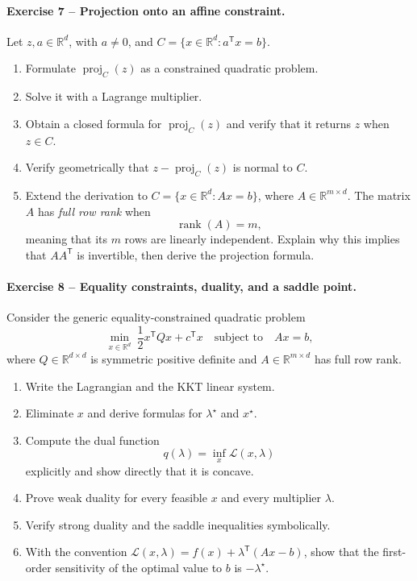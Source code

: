 \documentclass[10pt]{article}
\newcommand{\R}{\mathbb{R}}
\newcommand{\trans}{^{\mathsf T}}
\newcommand{\proj}{\operatorname{proj}}
\begin{document}
\paragraph{Exercise 7 -- Projection onto an affine constraint.}
Let $z,a\in\R^d$, with $a\neq0$, and
$C=\{x\in\R^d:a\trans x=b\}$.
\begin{enumerate}
\item Formulate $\proj_C(z)$ as a constrained quadratic problem.
\item Solve it with a Lagrange multiplier.
\item Obtain a closed formula for $\proj_C(z)$ and verify that it returns $z$
when $z\in C$.
\item Verify geometrically that $z-\proj_C(z)$ is normal to $C$.
\item Extend the derivation to $C=\{x\in\R^d:Ax=b\}$, where
$A\in\R^{m\times d}$. The matrix $A$ has \emph{full row rank} when
\[
  \operatorname{rank}(A)=m,
\]
meaning that its $m$ rows are linearly independent. Explain why this implies
that $AA\trans$ is invertible, then derive the projection formula.
\end{enumerate}

\paragraph{Exercise 8 -- Equality constraints, duality, and a saddle point.}
Consider the generic equality-constrained quadratic problem
\[
\min_{x\in\R^d}\ \frac12x\trans Qx+c\trans x
\quad\text{subject to}\quad Ax=b,
\]
where $Q\in\R^{d\times d}$ is symmetric positive definite and
$A\in\R^{m\times d}$ has full row rank.
\begin{enumerate}
\item Write the Lagrangian and the KKT linear system.
\item Eliminate $x$ and derive formulas for $\lambda^\star$ and $x^\star$.
\item Compute the dual function
\[
q(\lambda)=\inf_x\mathcal L(x,\lambda)
\]
explicitly and show directly that it is concave.
\item Prove weak duality for every feasible $x$ and every multiplier
$\lambda$.
\item Verify strong duality and the saddle inequalities symbolically.
\item With the convention
$\mathcal L(x,\lambda)=f(x)+\lambda\trans(Ax-b)$, show that the first-order
sensitivity of the optimal value to $b$ is $-\lambda^\star$.
\end{enumerate}
\end{document}
